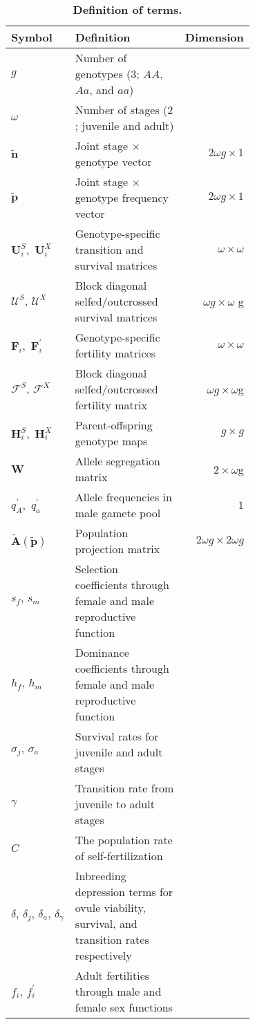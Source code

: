 \documentclass[11pt,draft]{article}
\def\mbf#1{\mathbf{#1}}
\def\mcal#1{\mathcal{#1}}
\begin{document}
\begin{table}[htbp]
\centering
\caption{\bf Definition of terms.}
\label{tab:Terms}
\begin{tabular}{ l p{0.7\linewidth} r }
 \toprule
Symbol & Definition & Dimension \\
\hline
$g$      & Number of genotypes ($3$; $AA$, $Aa$, and $aa$) & \\
$\omega$ & Number of stages ($2$; juvenile and adult) & \\
$\tilde{\mbf{n}}$ & Joint stage $\times$ genotype vector & $2 \omega g \times 1$ \\
$\tilde{\mbf{p}}$ & Joint stage $\times$ genotype frequency vector & $2 \omega g \times 1$ \\
$\mbf{U}^{S}_{i}$,\, $\mbf{U}^{X}_{i}$ & Genotype-specific transition and survival matrices & $\omega \times \omega$ \\
$\mcal{U}^{S},\, \mcal{U}^{X}$ & Block diagonal selfed/outcrossed survival matrices & $\omega g \times \omega$ g\\
$\mbf{F}_{i}$,\, $\mbf{F}^{\prime}_{i}$ & Genotype-specific fertility matrices & $\omega \times \omega$ \\
$\mcal{F}^{S},\, \mcal{F}^{X}$ & Block diagonal selfed/outcrossed fertility matrix & $\omega g \times \omega$g \\
$\mbf{H}^{S}_{i}$,\, $\mbf{H}^{X}_{i}$ & Parent-offspring genotype maps & $g \times g$ \\
$\mbf{W}$   & Allele segregation matrix & $2 \times \omega $g \\
$q^{\prime}_{A}$,\, $q^{\prime}_{a}$ & Allele frequencies in male gamete pool & $1$ \\
$\tilde{\mbf{A}}(\tilde{\mbf{p}})$ & Population projection matrix & $2 \omega g \times 2\omega g$ \\

$s_f,\,s_m$ & Selection coefficients through female and male reproductive function & \\
$h_f,\,h_m$ & Dominance coefficients through female and male reproductive function & \\
$\sigma_j,\, \sigma_a$ & Survival rates for juvenile and adult stages & \\
$\gamma$ & Transition rate from juvenile to adult stages \\
$C$ & The population rate of self-fertilization & \\
$\delta,\, \delta_j,\,\delta_a,\,\delta_{\gamma}$ & Inbreeding depression terms for ovule viability, survival, and transition rates respectively & \\
$f_i,\,f^{\prime}_i$ & Adult fertilities through male and female sex functions & \\

\hline
\end{tabular}
\end{table}
\newpage{}
\end{document}

